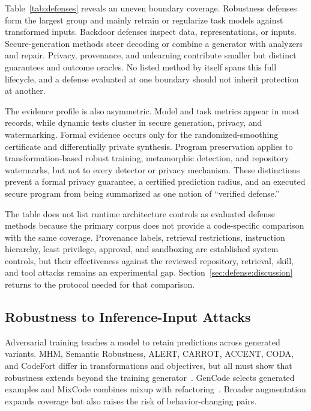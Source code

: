 \documentclass[acmsmall,screen,review]{acmart}
\begin{document}
Table~\ref{tab:defenses} reveals an uneven boundary coverage. Robustness defenses form the largest group and mainly retrain or regularize task models against transformed inputs. Backdoor defenses inspect data, representations, or inputs. Secure-generation methods steer decoding or combine a generator with analyzers and repair. Privacy, provenance, and unlearning contribute smaller but distinct guarantees and outcome oracles. No listed method by itself spans this full lifecycle, and a defense evaluated at one boundary should not inherit protection at another.

The evidence profile is also asymmetric. Model and task metrics appear in most records, while dynamic tests cluster in secure generation, privacy, and watermarking. Formal evidence occurs only for the randomized-smoothing certificate and differentially private synthesis. Program preservation applies to transformation-based robust training, metamorphic detection, and repository watermarks, but not to every detector or privacy mechanism. These distinctions prevent a formal privacy guarantee, a certified prediction radius, and an executed secure program from being summarized as one notion of ``verified defense.''

The table does not list runtime architecture controls as evaluated defense methods because the primary corpus does not provide a code-specific comparison with the same coverage. Provenance labels, retrieval restrictions, instruction hierarchy, least privilege, approval, and sandboxing are established system controls, but their effectiveness against the reviewed repository, retrieval, skill, and tool attacks remains an experimental gap. Section~\ref{sec:defense:discussion} returns to the protocol needed for that comparison.

\subsection{Robustness to Inference-Input Attacks} \label{sec:defense:robust}
Adversarial training teaches a model to retain predictions across generated variants. MHM, Semantic Robustness, ALERT, CARROT, ACCENT, CODA, and CodeFort differ in transformations and objectives, but all must show that robustness extends beyond the training generator~\cite{zhang2020generating,ramakrishnan2022semantic,yang2022natural,zhang2022carrot,zhou2022accent,tian2023coda,zhang2024codefort}. GenCode selects generated examples and MixCode combines mixup with refactoring~\cite{gencode2024,dong2023mixcode}. Broader augmentation expands coverage but also raises the risk of behavior-changing pairs.
\end{document}
